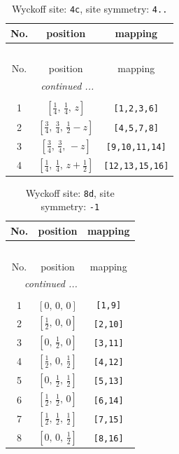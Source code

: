 \documentclass[fleqn,8pt]{jsarticle}
\begin{document}
\renewcommand{\arraystretch}{1.2}
\begin{longtable}{ccc}
\caption{Wyckoff site: {\tt 4c}, site symmetry: {\tt 4..}}
 \\
 \hline \hline
No. & position & mapping \\ \hline \endfirsthead

\multicolumn{2}{l}{\tablename\ \thetable{}} \\
 \hline \hline
No. & position & mapping \\ \hline \endhead

 \hline \hline
\multicolumn{2}{r}{\footnotesize\it continued ...} \\ \endfoot

 \hline \hline
\multicolumn{2}{r}{} \\ \endlastfoot

1 & $\left[ \frac{1}{4},\, \frac{1}{4},\, z \right]$ & {\tt [1,2,3,6]} \\ \hline
2 & $\left[ \frac{3}{4},\, \frac{3}{4},\, \frac{1}{2} - z \right]$ & {\tt [4,5,7,8]} \\ \hline
3 & $\left[ \frac{3}{4},\, \frac{3}{4},\, - z \right]$ & {\tt [9,10,11,14]} \\ \hline
4 & $\left[ \frac{1}{4},\, \frac{1}{4},\, z + \frac{1}{2} \right]$ & {\tt [12,13,15,16]} \\
\end{longtable}
\renewcommand{\arraystretch}{1.2}
\begin{longtable}{ccc}
\caption{Wyckoff site: {\tt 8d}, site symmetry: {\tt -1}}
 \\
 \hline \hline
No. & position & mapping \\ \hline \endfirsthead

\multicolumn{2}{l}{\tablename\ \thetable{}} \\
 \hline \hline
No. & position & mapping \\ \hline \endhead

 \hline \hline
\multicolumn{2}{r}{\footnotesize\it continued ...} \\ \endfoot

 \hline \hline
\multicolumn{2}{r}{} \\ \endlastfoot

1 & $\left[ 0,\, 0,\, 0 \right]$ & {\tt [1,9]} \\ \hline
2 & $\left[ \frac{1}{2},\, 0,\, 0 \right]$ & {\tt [2,10]} \\ \hline
3 & $\left[ 0,\, \frac{1}{2},\, 0 \right]$ & {\tt [3,11]} \\ \hline
4 & $\left[ \frac{1}{2},\, 0,\, \frac{1}{2} \right]$ & {\tt [4,12]} \\ \hline
5 & $\left[ 0,\, \frac{1}{2},\, \frac{1}{2} \right]$ & {\tt [5,13]} \\ \hline
6 & $\left[ \frac{1}{2},\, \frac{1}{2},\, 0 \right]$ & {\tt [6,14]} \\ \hline
7 & $\left[ \frac{1}{2},\, \frac{1}{2},\, \frac{1}{2} \right]$ & {\tt [7,15]} \\ \hline
8 & $\left[ 0,\, 0,\, \frac{1}{2} \right]$ & {\tt [8,16]} \\
\end{longtable}
\end{document}
